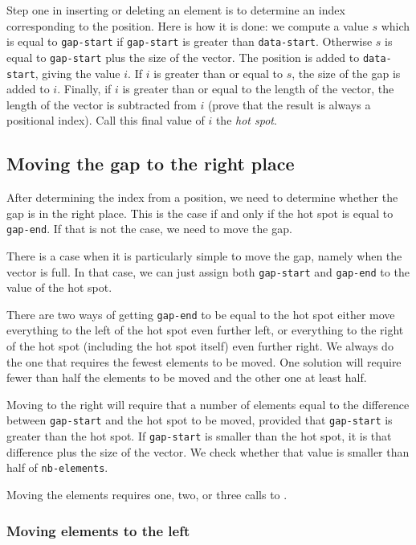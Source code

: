 \documentclass[11pt]{article}
\begin{document}
Step one in inserting or deleting an element is to determine an index
corresponding to the position.  Here is how it is done: we compute a
value $s$ which is equal to \texttt{gap-start} if \texttt{gap-start}
is greater than \texttt{data-start}.  Otherwise $s$ is equal to
\texttt{gap-start} plus the size of the vector.  The position is added
to \texttt{data-start}, giving the value $i$.  If $i$ is greater than
or equal to $s$, the size of the gap is added to $i$.  Finally, if $i$
is greater than or equal to the length of the vector, the length of
the vector is subtracted from $i$ (prove that the result is always a
positional index).  Call this final value of $i$ the \textit{hot
spot}.

\subsection{Moving the gap to the right place}

After determining the index from a position, we need to determine
whether the gap is in the right place.  This is the case if and only
if the hot spot is equal to \texttt{gap-end}.  If that is not the
case, we need to move the gap.

There is a case when it is particularly simple to move the gap, namely
when the vector is full.  In that case, we can just assign both
\texttt{gap-start} and \texttt{gap-end} to the value of the hot spot.

There are two ways of getting \texttt{gap-end} to be equal to the hot
spot either move everything to the left of the hot spot even further
left, or everything to the right of the hot spot (including the hot
spot itself) even further right. We always do the one that requires
the fewest elements to be moved.  One solution will require fewer than
half the elements to be moved and the other one at least half.

Moving to the right will require that a number of elements equal to
the difference between \texttt{gap-start} and the hot spot to be
moved, provided that \texttt{gap-start} is greater than the hot spot.
If \texttt{gap-start} is smaller than the hot spot, it is that
difference plus the size of the vector. We check whether that value is
smaller than half of \texttt{nb-elements}.

Moving the elements requires one, two, or three calls to .

\subsubsection{Moving elements to the left}
\end{document}
